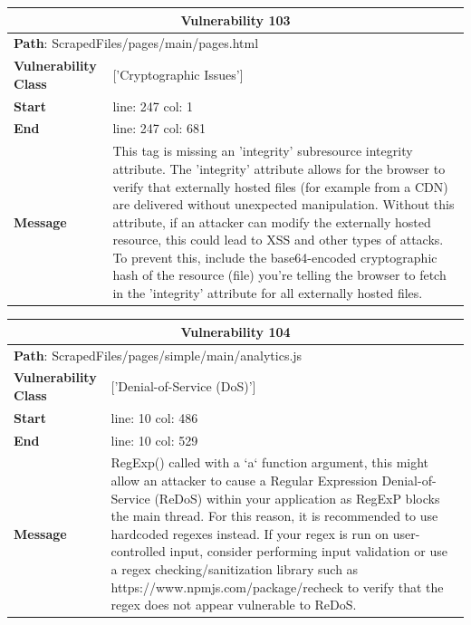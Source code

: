 \documentclass[12pt]{article}
\begin{document}
\vspace{0.7cm}
\FloatBarrier
\begin{table}[!h]
\centering
\renewcommand{\arraystretch}{1.3}
\begin{tabular}{|l|p{10cm}|}
\hline
\multicolumn{2}{|c|}{\textbf{Vulnerability 103}} \\
\hline
\multicolumn{2}{|l|}{\textbf{Path}: ScrapedFiles/pages/main/pages.html} \\
\hline
\textbf{Vulnerability Class} & ['Cryptographic Issues'] \\
\hline
\textbf{Start} & line: 247 \quad col: 1 \\
\hline
\textbf{End} & line: 247 \quad col: 681 \\
\hline
\textbf{Message} & This tag is missing an 'integrity' subresource integrity attribute. The 'integrity' attribute allows for the browser to verify that externally hosted files (for example from a CDN) are delivered without unexpected manipulation. Without this attribute, if an attacker can modify the externally hosted resource, this could lead to XSS and other types of attacks. To prevent this, include the base64-encoded cryptographic hash of the resource (file) you're telling the browser to fetch in the 'integrity' attribute for all externally hosted files. \\
\hline
\end{tabular}
\end{table}
\vspace{0.7cm}
\FloatBarrier
\begin{table}[!h]
\centering
\renewcommand{\arraystretch}{1.3}
\begin{tabular}{|l|p{10cm}|}
\hline
\multicolumn{2}{|c|}{\textbf{Vulnerability 104}} \\
\hline
\multicolumn{2}{|l|}{\textbf{Path}: ScrapedFiles/pages/simple/main/analytics.js} \\
\hline
\textbf{Vulnerability Class} & ['Denial-of-Service (DoS)'] \\
\hline
\textbf{Start} & line: 10 \quad col: 486 \\
\hline
\textbf{End} & line: 10 \quad col: 529 \\
\hline
\textbf{Message} & RegExp() called with a `a` function argument, this might allow an attacker to cause a Regular Expression Denial-of-Service (ReDoS) within your application as RegExP blocks the main thread. For this reason, it is recommended to use hardcoded regexes instead. If your regex is run on user-controlled input, consider performing input validation or use a regex checking/sanitization library such as https://www.npmjs.com/package/recheck to verify that the regex does not appear vulnerable to ReDoS. \\
\hline
\end{tabular}
\end{table}
\end{document}
